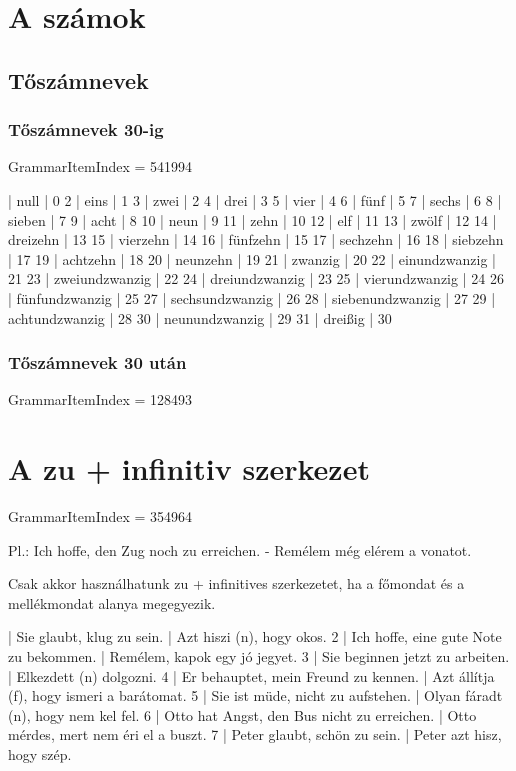 \documentclass{article}
\newenvironment{desc}{\verbatim}{\endverbatim}
\newenvironment{exmp}{\verbatim}{\endverbatim}
\begin{document}
\section{A számok}

\subsection{Tőszámnevek}

\subsubsection{Tőszámnevek 30-ig}

GrammarItemIndex = 541994

\begin{exmp}
1 | null | 0
2 | eins | 1
3 | zwei | 2
4 | drei | 3
5 | vier | 4
6 | fünf | 5
7 | sechs | 6
8 | sieben | 7
9 | acht | 8
10 | neun | 9
11 | zehn | 10
12 | elf | 11
13 | zwölf | 12
14 | dreizehn | 13
15 | vierzehn | 14
16 | fünfzehn | 15
17 | sechzehn | 16
18 | siebzehn | 17
19 | achtzehn | 18
20 | neunzehn | 19
21 | zwanzig | 20
22 | einundzwanzig | 21
23 | zweiundzwanzig | 22
24 | dreiundzwanzig | 23
25 | vierundzwanzig | 24
26 | fünfundzwanzig | 25
27 | sechsundzwanzig | 26
28 | siebenundzwanzig | 27
29 | achtundzwanzig | 28
30 | neunundzwanzig | 29
31 | dreißig | 30
\end{exmp}

\subsubsection{Tőszámnevek 30 után}

GrammarItemIndex = 128493

\section{A zu + infinitiv szerkezet}

GrammarItemIndex = 354964

\begin{desc}
Pl.: Ich hoffe, den Zug noch zu erreichen. - Remélem még elérem a vonatot.

Csak akkor használhatunk zu + infinitives szerkezetet, ha a főmondat és a mellékmondat alanya megegyezik.
\end{desc}

\begin{exmp}
1 | Sie glaubt, klug zu sein. | Azt hiszi (n), hogy okos.
2 | Ich hoffe, eine gute Note zu bekommen. | Remélem, kapok egy jó jegyet.
3 | Sie beginnen jetzt zu arbeiten. | Elkezdett (n) dolgozni.
4 | Er behauptet, mein Freund zu kennen. | Azt állítja (f), hogy ismeri a barátomat.
5 | Sie ist müde, nicht zu aufstehen. | Olyan fáradt (n), hogy nem kel fel.
6 | Otto hat Angst, den Bus nicht zu erreichen. | Otto mérdes, mert nem éri el a buszt.
7 | Peter glaubt, schön zu sein. | Peter azt hisz, hogy szép.
\end{exmp}
\end{document}
